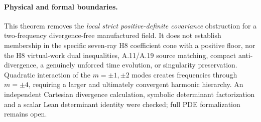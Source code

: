 \paragraph{Physical and formal boundaries.}
This theorem removes the \emph{local strict positive-definite
covariance} obstruction for a two-frequency divergence-free
manufactured field. It does not establish membership in the
specific seven-ray H8 coefficient cone with a positive floor,
nor the H8 virtual-work dual inequalities, A.11/A.19 source
matching, compact anti-divergence, a genuinely unforced time
evolution, or singularity preservation. Quadratic interaction
of the $m=\pm1,\pm2$ modes creates frequencies through
$m=\pm4$, requiring a larger and ultimately convergent
harmonic hierarchy. An independent Cartesian divergence
calculation, symbolic determinant factorization and a scalar
Lean determinant identity were checked; full PDE formalization
remains open.
